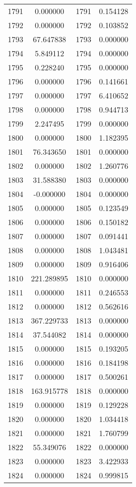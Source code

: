 \documentclass[12pt]{article}
\begin{document}
\begin{longtable}{@{}cccc@{}}
1791 & 0.000000 & 1791 & 0.154128 \\
1792 & 0.000000 & 1792 & 0.103852 \\
1793 & 67.647838 & 1793 & 0.000000 \\
1794 & 5.849112 & 1794 & 0.000000 \\
1795 & 0.228240 & 1795 & 0.000000 \\
1796 & 0.000000 & 1796 & 0.141661 \\
1797 & 0.000000 & 1797 & 6.410652 \\
1798 & 0.000000 & 1798 & 0.944713 \\
1799 & 2.247495 & 1799 & 0.000000 \\
1800 & 0.000000 & 1800 & 1.182395 \\
1801 & 76.343650 & 1801 & 0.000000 \\
1802 & 0.000000 & 1802 & 1.260776 \\
1803 & 31.588380 & 1803 & 0.000000 \\
1804 & -0.000000 & 1804 & 0.000000 \\
1805 & 0.000000 & 1805 & 0.123549 \\
1806 & 0.000000 & 1806 & 0.150182 \\
1807 & 0.000000 & 1807 & 0.091441 \\
1808 & 0.000000 & 1808 & 1.043481 \\
1809 & 0.000000 & 1809 & 0.916406 \\
1810 & 221.289895 & 1810 & 0.000000 \\
1811 & 0.000000 & 1811 & 0.246553 \\
1812 & 0.000000 & 1812 & 0.562616 \\
1813 & 367.229733 & 1813 & 0.000000 \\
1814 & 37.544082 & 1814 & 0.000000 \\
1815 & 0.000000 & 1815 & 0.193205 \\
1816 & 0.000000 & 1816 & 0.184198 \\
1817 & 0.000000 & 1817 & 0.500261 \\
1818 & 163.915778 & 1818 & 0.000000 \\
1819 & 0.000000 & 1819 & 0.129228 \\
1820 & 0.000000 & 1820 & 1.034418 \\
1821 & 0.000000 & 1821 & 1.760799 \\
1822 & 55.349076 & 1822 & 0.000000 \\
1823 & 0.000000 & 1823 & 3.422933 \\
1824 & 0.000000 & 1824 & 0.999815 \\

\end{longtable}
\end{document}

